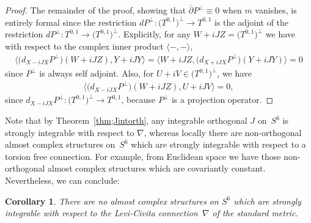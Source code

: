 \documentclass[11pt]{article}
\newtheorem{cor}[thm]{Corollary}
\numberwithin{equation}{section}
\begin{document}
\begin{proof}
The remainder of the proof, showing that $\overline{\partial} P^\perp \equiv 0$ when $m$ vanishes, is entirely formal since the restriction $dP^\perp\colon \big(T^{0,1}\big)^\perp \to T^{0,1}$ is the adjoint of the restriction $dP^\perp\colon T^{0,1} \to \big(T^{0,1}\big)^\perp$. Explicitly, for any $W + i JZ = \big(T^{0,1}\big)^\perp$ we have with respect to the complex inner product $\langle - , - \rangle$,
\begin{gather*}
\big\langle \big( d_{X-iJX} P^\perp \big) (W+iJZ) , Y+i JY \big\rangle
= \big\langle W+iJZ , \big( d_{X+iJX} P^\perp \big)( Y+i JY )\big\rangle = 0
\end{gather*}
since $P^\perp$ is always self adjoint. Also, for $U + iV \in \big(T^{0,1}\big)^\perp$, we have
\begin{gather*}
\big\langle \big( d_{X-iJX} P^\perp \big) (W+iJZ) , U+iJV \big\rangle = 0,
\end{gather*}
since $d_{X-iJX} P^\perp \colon \big(T^{0,1}\big)^\perp \to T^{0,1}$, because $P^\perp$ is a projection operator.
\end{proof}

Note that by Theorem~\ref{thm;Jintorth}, any integrable orthogonal $J$ on~$S^6$ is strongly integrable with respect to $\nabla$, whereas locally there are non-orthogonal almost complex structures on~$S^6$ which are strongly integrable with respect to a torsion free connection. For example, from Euclidean space we have those non-orthogonal almost complex structures which are covariantly constant. Nevertheless, we can conclude:

\begin{cor} \label{cor;noStrongJ}There are no almost complex structures on $S^6$ which are strongly integrable with respect to the Levi-Civita connection~$\nabla$ of the standard metric.
\end{cor}
\end{document}
